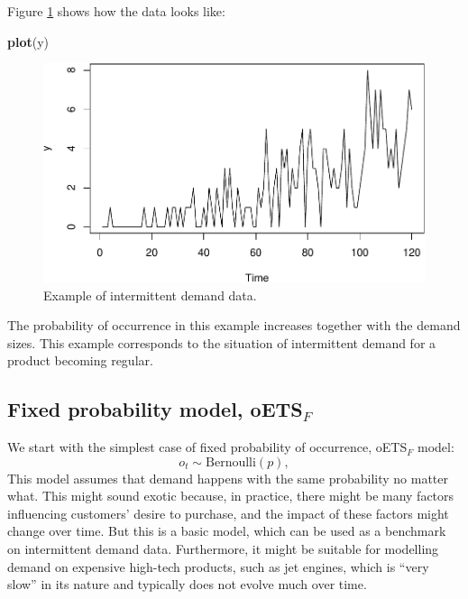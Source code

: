 \documentclass[]{book}
\newenvironment{Shaded}{\begin{snugshade}}{\end{snugshade}}
\newcommand{\KeywordTok}[1]{\textcolor[rgb]{0.13,0.29,0.53}{\textbf{#1}}}
\newcommand{\NormalTok}[1]{#1}
\theoremstyle{definition}
\theoremstyle{definition}
\theoremstyle{definition}
\theoremstyle{definition}
\theoremstyle{remark}
\begin{document}
Figure \ref{fig:intermittentExamplePlot} shows how the data looks like:

\begin{Shaded}
\begin{Highlighting}[]
\KeywordTok{plot}\NormalTok{(y)}
\end{Highlighting}
\end{Shaded}

\begin{figure}
\centering
\includegraphics{Svetunkov--2022----ADAM_files/figure-latex/intermittentExamplePlot-1.pdf}
\caption{\label{fig:intermittentExamplePlot}Example of intermittent demand data.}
\end{figure}

The probability of occurrence in this example increases together with the demand sizes. This example corresponds to the situation of intermittent demand for a product becoming regular.

\hypertarget{fixed-probability-model-oets_f}{%
\subsection{\texorpdfstring{Fixed probability model, oETS\(_F\)}{Fixed probability model, oETS\_F}}\label{fixed-probability-model-oets_f}}

We start with the simplest case of fixed probability of occurrence, oETS\(_F\) model:
\begin{equation}
o_t \sim \text{Bernoulli}(p) ,
\label{eq:oETSFixed}
\end{equation}
This model assumes that demand happens with the same probability no matter what. This might sound exotic because, in practice, there might be many factors influencing customers' desire to purchase, and the impact of these factors might change over time. But this is a basic model, which can be used as a benchmark on intermittent demand data. Furthermore, it might be suitable for modelling demand on expensive high-tech products, such as jet engines, which is ``very slow'' in its nature and typically does not evolve much over time.
\end{document}
